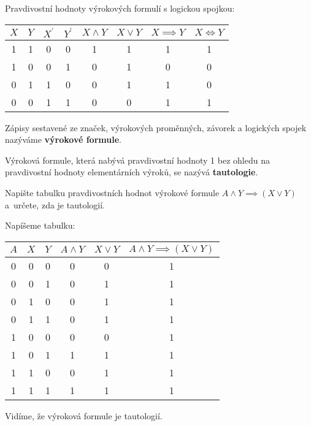 \begin{pozn}
  Pravdivostní hodnoty výrokových formulí s logickou spojkou:
  \begin{center}
    \begin{tabular}{c c | c c | c c c c}
      $X$ & $Y$ & $X^\prime$ & $Y^\prime$ & $X\land Y$ & $X\lor Y$ & $X\implies Y$ & $X\iff Y$ \\
      \hline
      1 & 1 & 0 & 0 & 1 & 1 & 1 & 1 \\
      1 & 0 & 0 & 1 & 0 & 1 & 0 & 0 \\
      0 & 1 & 1 & 0 & 0 & 1 & 1 & 0 \\
      0 & 0 & 1 & 1 & 0 & 0 & 1 & 1 \\
    \end{tabular}
  \end{center}
\end{pozn}

\begin{definition}
  Zápisy sestavené ze značek, výrokových proměnných, závorek a logických spojek nazýváme \textbf{výrokové formule}.
\end{definition}

\begin{definition}
  Výroková formule, která nabývá pravdivostní hodnoty 1 bez ohledu na pravdivostní hodnoty elementárních výroků, se nazývá \textbf{tautologie}.
\end{definition}

\begin{priklad}
    Napište tabulku pravdivostních hodnot výrokové formule $A\land Y \implies (X\lor Y)$ a~určete,
    zda je tautologií.
\end{priklad}

\begin{reseni}
Napíšeme tabulku:
  \begin{center}
    \begin{tabular}{c c c | c c | c}
      $A$ & $X$ & $Y$ & $A \land Y$ & $X \lor Y$ & $A\land Y \implies (X\lor Y)$ \\
      \hline
      0 & 0 & 0 & 0 & 0 & 1  \\
      0 & 0 & 1 & 0 & 1 & 1  \\
      0 & 1 & 0 & 0 & 1 & 1  \\
      0 & 1 & 1 & 0 & 1 & 1  \\
      1 & 0 & 0 & 0 & 0 & 1  \\
      1 & 0 & 1 & 1 & 1 & 1  \\
      1 & 1 & 0 & 0 & 1 & 1  \\
      1 & 1 & 1 & 1 & 1 & 1  \\
    \end{tabular}
  \end{center}
  Vidíme, že výroková formule je tautologií.
\end{reseni}


